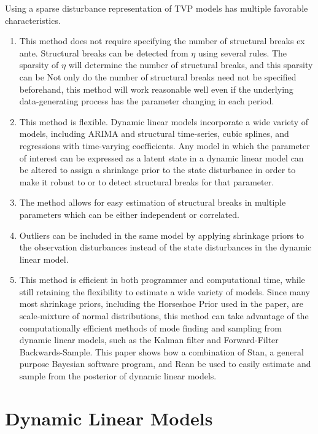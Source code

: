 \documentclass{article}
\newcommand{\RLang}{\textsf{R}}
\newcommand{\Stan}{Stan}
\begin{document}
Using a sparse disturbance representation of TVP models has multiple favorable characteristics.
\begin{enumerate}
\item This method does not require specifying the number of structural breaks ex ante.
Structural breaks can be detected from $\eta$ using several rules.
The sparsity of $\eta$ will determine the number of structural breaks, and this sparsity can be 
Not only do the number of structural breaks need not be specified beforehand, this method will work reasonable well even if the underlying data-generating process has the parameter changing in each period.
\item This method is flexible.
Dynamic linear models incorporate a wide variety of models, including ARIMA and structural time-series, cubic splines, and regressions with time-varying coefficients.
Any model in which the parameter of interest can be expressed as a latent state in a dynamic linear model can be altered to assign a shrinkage prior to the state disturbance in order to make it robust to or to detect structural breaks for that parameter.
\item The method allows for easy estimation of structural breaks in multiple parameters which can be either independent or correlated.
\item Outliers can be included in the same model by applying shrinkage priors to the observation disturbances instead of the state disturbances in the dynamic linear model.
\item This method is efficient in both programmer and computational time, while still retaining the flexibility to estimate a wide variety of models.
Since many most shrinkage priors, including the Horseshoe Prior used in the paper, are scale-mixture of normal distributions, this method can take advantage of the computationally efficient methods of mode finding and sampling from dynamic linear models, such as the Kalman filter and Forward-Filter Backwards-Sample.
This paper shows how a combination of \Stan, a general purpose Bayesian software program, and \RLang can be used to easily estimate and sample from the posterior of dynamic linear models.
\end{enumerate}


\section{Dynamic Linear Models}
\label{sec:dynam-line-models}
\end{document}
